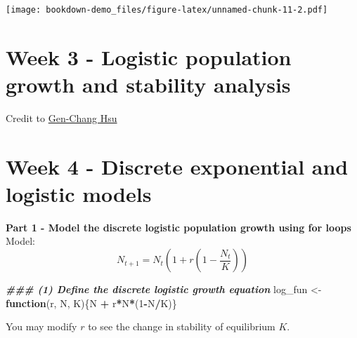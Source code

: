 \documentclass[
]{book}
\newenvironment{Shaded}{\begin{snugshade}}{\end{snugshade}}
\newcommand{\AttributeTok}[1]{\textcolor[rgb]{0.13,0.29,0.53}{#1}}
\newcommand{\ControlFlowTok}[1]{\textcolor[rgb]{0.13,0.29,0.53}{\textbf{#1}}}
\newcommand{\DecValTok}[1]{\textcolor[rgb]{0.00,0.00,0.81}{#1}}
\newcommand{\DocumentationTok}[1]{\textcolor[rgb]{0.56,0.35,0.01}{\textbf{\textit{#1}}}}
\newcommand{\FloatTok}[1]{\textcolor[rgb]{0.00,0.00,0.81}{#1}}
\newcommand{\FunctionTok}[1]{\textcolor[rgb]{0.13,0.29,0.53}{\textbf{#1}}}
\newcommand{\NormalTok}[1]{#1}
\newcommand{\OtherTok}[1]{\textcolor[rgb]{0.56,0.35,0.01}{#1}}
\newcommand{\SpecialCharTok}[1]{\textcolor[rgb]{0.81,0.36,0.00}{\textbf{#1}}}
\begin{document}
\texttt{[image: bookdown-demo\_files/figure-latex/unnamed-chunk-11-2.pdf]}

\hypertarget{week-3---logistic-population-growth-and-stability-analysis}{%
\chapter*{Week 3 - Logistic population growth and stability analysis}\label{week-3---logistic-population-growth-and-stability-analysis}}

Credit to \href{https://genchanghsu.github.io/index.html}{Gen-Chang Hsu}

\hypertarget{week-4---discrete-exponential-and-logistic-models}{%
\chapter*{Week 4 - Discrete exponential and logistic models}\label{week-4---discrete-exponential-and-logistic-models}}

\textbf{Part 1 - Model the discrete logistic population growth using for loops}
Model:
\[
N_{t+1} = N_t(1+r(1-\frac{N_t}{K}))
\]

\begin{Shaded}
\begin{Highlighting}[]
\DocumentationTok{\#\#\# (1) Define the discrete logistic growth equation}
\NormalTok{log\_fun }\OtherTok{\textless{}{-}} \ControlFlowTok{function}\NormalTok{(r, N, K)\{N }\SpecialCharTok{+}\NormalTok{ r}\SpecialCharTok{*}\NormalTok{N}\SpecialCharTok{*}\NormalTok{(}\DecValTok{1}\SpecialCharTok{{-}}\NormalTok{N}\SpecialCharTok{/}\NormalTok{K)\}}
\end{Highlighting}
\end{Shaded}

You may modify \(r\) to see the change in stability of equilibrium \(K\).

\begin{Shaded}
\end{Shaded}
\end{document}
